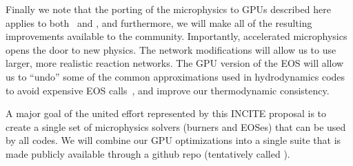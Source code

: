 Finally we note that the porting of the microphysics to GPUs described
here applies to both \maestro\ and \castro, and furthermore, we will
make all of the resulting improvements available to the community.
Importantly, accelerated microphysics opens the door to new physics.
The network modifications will allow us to use larger, more realistic
reaction networks.  The GPU version of the EOS will allow us to 
``undo'' some of the common approximations used in hydrodynamics 
codes to avoid expensive EOS calls~\cite{colellaglaz:1985}, and improve our thermodynamic
consistency.


A major goal of the united effort represented by this INCITE proposal 
is to create a single set of microphysics solvers (burners and EOSes)
that can be used by all codes.  We will combine our GPU optimizations
into a single suite that is made publicly available through a github
repo (tentatively called \starkiller).
